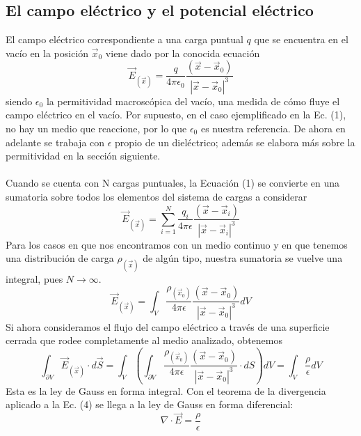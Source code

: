 \documentclass[12pt, notitlepage]{article}
\begin{document}
\subsection{El campo eléctrico y el potencial eléctrico}
El campo eléctrico correspondiente a una carga puntual $q$ que se encuentra en el vacío en la posición $\vec{x}_0$ viene dado por la conocida ecuación
\begin{equation}
\vec{E}_{(\vec{x})} = \frac{q}{4\pi\epsilon_0}\frac{(\vec{x} - \vec{x}_0)}{|\vec{x}-\vec{x}_0|^3}
\end{equation}
siendo $\epsilon_0$ la permitividad macroscópica del vacío, una medida de cómo fluye el campo eléctrico en el vacío. Por supuesto, en el caso ejemplificado en la Ec. (1), no hay un medio que reaccione, por lo que $\epsilon_0$ es nuestra referencia. De ahora en adelante se trabaja con $\epsilon$ propio de un dieléctrico; además se elabora más sobre la permitividad en la sección siguiente.\\\\
Cuando se cuenta con N cargas puntuales, la Ecuación (1) se convierte en una sumatoria sobre todos los elementos del sistema de cargas a considerar
\begin{equation}
\vec{E}_{(\vec{x})} = \sum_{i=1}^N\frac{q_i}{4\pi\epsilon}\frac{(\vec{x} - \vec{x}_i)}{|\vec{x}-\vec{x}_i|^3}
\end{equation}
Para los casos en que nos encontramos con un medio  continuo y en que tenemos una distribución de carga $\rho_{(\vec{x})}$ de algún tipo, nuestra sumatoria se vuelve una integral, pues $N\rightarrow \infty$.
\begin{equation}
\vec{E}_{(\vec{x})} = \int_V\frac{\rho_{(\vec{x}_0)}}{4\pi\epsilon}\frac{(\vec{x} - \vec{x}_0)}{|\vec{x}-\vec{x}_0|^3} dV
\end{equation}
Si ahora consideramos el flujo del campo eléctrico a través de una superficie cerrada que rodee completamente al medio analizado, obtenemos
\begin{equation}
\int_{\partial V}\vec{E}_{(\vec{x})}\cdot d\vec{S} = \int_V\left(\int_{\partial V}\frac{\rho_{(\vec{x}_0)}}{4\pi\epsilon}\frac{(\vec{x} - \vec{x}_0)}{|\vec{x}-\vec{x}_0|^3}\cdot dS\right)dV = \int_V \frac{\rho}{\epsilon} dV
\end{equation}
Esta es la ley de Gauss en forma integral. Con el teorema de la divergencia aplicado a la Ec. (4) se llega a la ley de Gauss en forma diferencial:
\begin{equation}
\nabla\cdot\vec{E} = \frac{\rho}{\epsilon}
\end{equation}
\end{document}
